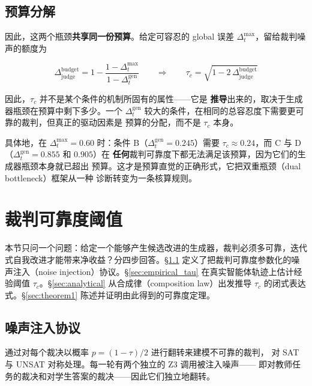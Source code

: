 \subsection{预算分解}

因此，这两个瓶颈\textbf{共享同一份预算}。给定可容忍的 global 误差
$\Delta_t^{\max}$，留给裁判噪声的额度为

\[
  \Delta_{\mathrm{judge}}^{\mathrm{budget}} = 1 - \frac{1-\Delta_t^{\max}}{1-\Delta_t^{\mathrm{gen}}}
  \qquad\Longrightarrow\qquad
  \tau_c = \sqrt{1 - 2\,\Delta_{\mathrm{judge}}^{\mathrm{budget}}}
\]

因此，$\tau_c$ 并不是某个条件的机制所固有的属性——它是
\textbf{推导}出来的，取决于生成器瓶颈在预算中剩下多少。一个
$\Delta_t^{\mathrm{gen}}$ 较大的条件，在相同的总容忍度下需要更可靠的裁判，但真正的驱动因素是
预算的分配，而不是 $\tau_c$ 本身。

具体地，在 $\Delta_t^{\max} = 0.60$ 时：条件 B（$\Delta_t^{\mathrm{gen}} = 0.245$）需要
$\tau_c \approx 0.24$，而 C 与 D（$\Delta_t^{\mathrm{gen}} = 0.855$ 和 $0.905$）在
\textbf{任何}裁判可靠度下都无法满足该预算，因为它们的生成器瓶颈本身就已超出
预算。这才是预算直觉的正确形式，它把双重瓶颈（dual bottleneck）框架从一种
诊断转变为一条核算规则。

\section{裁判可靠度阈值}
\label{sec:judge}

本节只问一个问题：给定一个能够产生候选改进的生成器，裁判必须多可靠，迭代式自我改进才能带来净收益？分四步回答。\S\ref{sec:noise} 定义了把裁判可靠度参数化的噪声注入（noise injection）协议。\S\ref{sec:empirical_tau} 在真实智能体轨迹上估计经验阈值 $\tau_c$。\S\ref{sec:analytical} 从合成律（composition law）出发推导 $\tau_c$ 的闭式表达式。\S\ref{sec:theorem1} 陈述并证明由此得到的可靠度定理。

\subsection{噪声注入协议}
\label{sec:noise}

通过对每个裁决以概率 $p = (1-\tau)/2$ 进行翻转来建模不可靠的裁判，
对 SAT 与 UNSAT 对称处理。每一轮有两个独立的 Z3 调用被注入噪声——
即对教师任务的裁决和对学生答案的裁决——因此它们独立地翻转。

